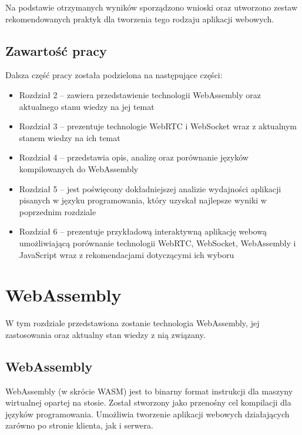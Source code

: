 \documentclass[language=polish,type=master]{aghmodern}
\begin{document}
Na podstawie otrzymanych wyników sporządzono wnioski oraz utworzono zestaw rekomendowanych praktyk dla tworzenia tego rodzaju aplikacji webowych.

\section{Zawartość pracy}
Dalsza część pracy została podzielona na następujące części:

\begin{itemize}
    \item Rozdział 2 -- zawiera przedstawienie technologii WebAssembly oraz aktualnego stanu wiedzy na jej temat
    \item Rozdział 3 -- prezentuje technologie WebRTC i WebSocket wraz z aktualnym stanem wiedzy na ich temat
    \item Rozdział 4 -- przedstawia opis, analizę oraz porównanie języków kompilowanych do WebAssembly
    \item Rozdział 5 -- jest poświęcony dokładniejszej analizie wydajności aplikacji pisanych w języku programowania, który uzyskał najlepsze wyniki w poprzednim rozdziale
    \item Rozdział 6 -- prezentuje przykładową interaktywną aplikację webową umożliwiającą porównanie technologii WebRTC, WebSocket, WebAssembly i JavaScript wraz z rekomendacjami dotyczącymi ich wyboru
\end{itemize}

\chapter{WebAssembly}
W tym rozdziale przedstawiona zostanie technologia WebAssembly, jej zastosowania oraz aktualny stan wiedzy z nią związany.

\section{WebAssembly}
WebAssembly (w skrócie WASM) jest to binarny format instrukcji dla maszyny wirtualnej opartej na stosie.
Został stworzony jako przenośny cel kompilacji dla języków programowania\footnotemark{}.
Umożliwia tworzenie aplikacji webowych działających zarówno po stronie klienta, jak i serwera.
\end{document}
